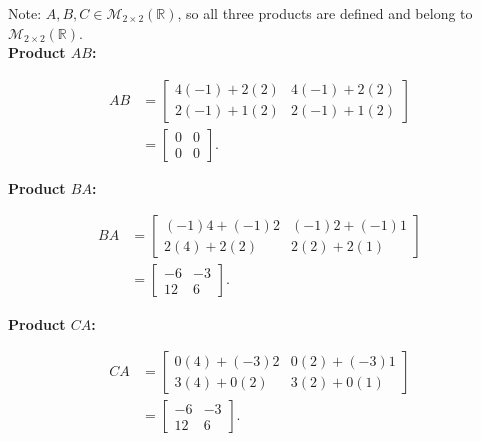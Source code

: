 \begin{answer}
    Note: $A,B,C \in \mathcal{M}_{2\times2}(\mathbb{R})$,
    so all three products are defined and belong to
    $\mathcal{M}_{2\times2}(\mathbb{R})$.\\

    \textbf{Product $AB$:}

    $$
    \begin{aligned}
        AB
        &= \begin{bmatrix}
            4(-1)+2(2) & 4(-1)+2(2) \\
            2(-1)+1(2) & 2(-1)+1(2)
        \end{bmatrix} \\[0.5em]
        &= \boxed{\begin{bmatrix}
            0 & 0 \\
            0 & 0
        \end{bmatrix}}.
    \end{aligned}
    $$

    \textbf{Product $BA$:}

    $$
    \begin{aligned}
        BA
        &= \begin{bmatrix}
            (-1)4+(-1)2 & (-1)2+(-1)1 \\
            2(4)+2(2) & 2(2)+2(1)
        \end{bmatrix} \\[0.5em]
        &= \boxed{\begin{bmatrix}
            -6 & -3 \\
            12 & 6
        \end{bmatrix}}.
    \end{aligned}
    $$

    \textbf{Product $CA$:}

    $$
    \begin{aligned}
        CA
        &= \begin{bmatrix}
            0(4)+(-3)2 & 0(2)+(-3)1 \\
            3(4)+0(2) & 3(2)+0(1)
        \end{bmatrix} \\[0.5em]
        &= \boxed{\begin{bmatrix}
            -6 & -3 \\
            12 & 6
        \end{bmatrix}}.
    \end{aligned}
    $$
\end{answer}
